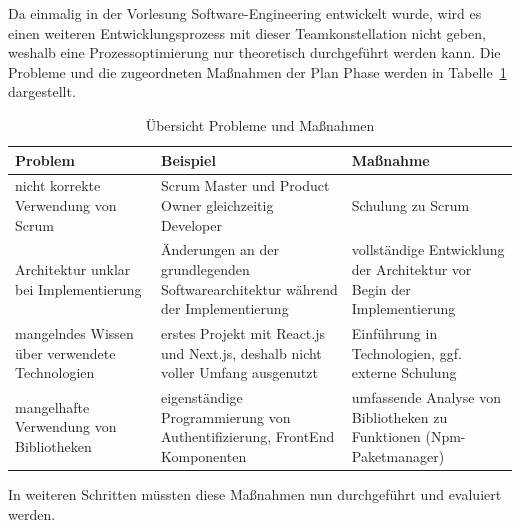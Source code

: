 Da  einmalig in der Vorlesung Software-Engineering entwickelt wurde, wird es einen weiteren Entwicklungsprozess mit dieser Teamkonstellation nicht geben, weshalb eine Prozessoptimierung nur theoretisch durchgeführt werden kann.
Die Probleme und die zugeordneten Maßnahmen der Plan Phase werden in Tabelle~\ref{tab:pdca} dargestellt.
\begin{table}[H]
  \centering
  \begin{tabular}{l|l|l}
    \textbf{Problem} & 
    \textbf{Beispiel} & 
    \textbf{Maßnahme} 
    \\\hline
    \multirow{3}{.25\textwidth}{nicht korrekte Verwendung von Scrum} & 
    \multirow{3}{.35\textwidth}{Scrum Master und Product Owner gleichzeitig Developer} & 
    \multirow{3}{.3\textwidth}{Schulung zu Scrum} 
    \\
    &&\\
    &&\\\hline
    \multirow{4}{.25\textwidth}{Architektur unklar bei Implementierung} &
    \multirow{4}{.35\textwidth}{Änderungen an der grund\-le\-gen\-den Softwarearchitektur während der Implementierung} & 
    \multirow{4}{.3\textwidth}{vollständige Entwicklung der Architektur vor Begin der Implementierung} 
    \\
    &&\\
    &&\\
    &&\\\hline
    \multirow{3}{.25\textwidth}{mangelndes Wissen über verwendete Technologien} & 
    \multirow{3}{.35\textwidth}{erstes Projekt mit React.js und Next.js, deshalb nicht voller Umfang ausgenutzt} & 
    \multirow{3}{.3\textwidth}{Einführung in Technologien, ggf. externe Schulung}
    \\
    &&\\
    &&\\\hline
    \multirow{3}{.25\textwidth}{mangelhafte Verwendung von Bibliotheken} &
    \multirow{3}{.35\textwidth}{eigenständige Programmierung von Authentifizierung, FrontEnd Komponenten} & 
    \multirow{3}{.3\textwidth}{umfassende Analyse von Bibliotheken zu Funktionen (Npm-Paketmanager)}
    \\
    &&\\
    &&\\ 
  \end{tabular}
  \caption{Übersicht Probleme und Maßnahmen}
  \label{tab:pdca}
\end{table}\noindent
In weiteren Schritten müssten diese Maßnahmen nun durchgeführt und evaluiert werden.
